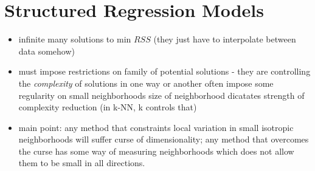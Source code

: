 \section{Structured Regression Models}
\begin{itemize}
  \item infinite many solutions to min $RSS$ (they just have to interpolate between data somehow)
  \item must impose restrictions on family of potential solutions - they are controlling the \emph{complexity} of solutions in one way or another
    \subitem often impose some regularity on small neighborhoods
    \subitem size of neighborhood dicatates strength of complexity reduction (in k-NN, k controls that)
  \item main point: any method that constraints local variation in small isotropic neighborhoods will suffer curse of dimensionality; any method that overcomes the curse has some way of measuring neighborhoods which does not allow them to be small in all directions.
\end{itemize}

